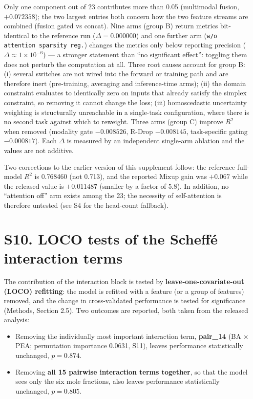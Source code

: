 \documentclass[utf8]{frontiers_suppmat}
\begin{document}
Only one component out of 23 contributes more than 0.05 (multimodal fusion, $+0.072358$); the two largest entries both concern how the two feature streams are combined (fusion gated vs concat). Nine arms (group B) return metrics bit-identical to the reference run ($\Delta = 0.000000$) and one further arm (\texttt{w/o attention sparsity reg.}) changes the metrics only below reporting precision ($\Delta \approx 1 \times 10^{-6}$) --- a stronger statement than ``no significant effect'': toggling them does not perturb the computation at all. Three root causes account for group B: (i) several switches are not wired into the forward or training path and are therefore inert (pre-training, averaging and inference-time arms); (ii) the domain constraint evaluates to identically zero on inputs that already satisfy the simplex constraint, so removing it cannot change the loss; (iii) homoscedastic uncertainty weighting is structurally unreachable in a single-task configuration, where there is no second task against which to reweight. Three arms (group C) improve $R^2$ when removed (modality gate $-0.008526$, R-Drop $-0.008145$, task-specific gating $-0.000817$). Each $\Delta$ is measured by an independent single-arm ablation and the values are not additive.

Two corrections to the earlier version of this supplement follow: the reference full-model $R^2$ is 0.768460 (not 0.713), and the reported Mixup gain was $+0.067$ while the released value is $+0.011487$ (smaller by a factor of 5.8). In addition, no ``attention off'' arm exists among the 23; the necessity of self-attention is therefore untested (see S4 for the head-count fallback).

\section{S10. LOCO tests of the Scheff\'e interaction terms}

The contribution of the interaction block is tested by \textbf{leave-one-covariate-out (LOCO) refitting}: the model is refitted with a feature (or a group of features) removed, and the change in cross-validated performance is tested for significance (Methods, Section 2.5). Two outcomes are reported, both taken from the released analysis:

\begin{itemize}
\item Removing the individually most important interaction term, \textbf{pair\_14} (BA $\times$ PEA; permutation importance 0.0631, S11), leaves performance statistically unchanged, \textbf{$p = 0.874$}.
\item Removing \textbf{all 15 pairwise interaction terms together}, so that the model sees only the six mole fractions, also leaves performance statistically unchanged, \textbf{$p = 0.805$}.
\end{itemize}
\end{document}
